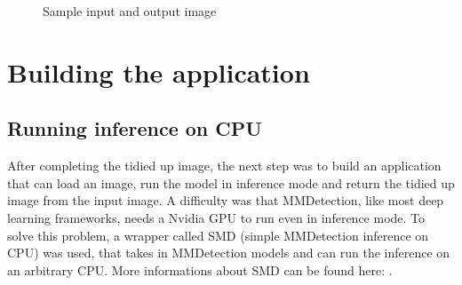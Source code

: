 \begin{figure}[H]
    \centering
    \caption{\label{fig:sample-input-output} Sample input and output image}
\end{figure}

\section{Building the application}

\subsection{Running inference on CPU}
\label{inference-cpu}

After completing the tidied up image, the next step was to build an application that can load an image, run the model in inference mode and return the tidied up image from the input image. A difficulty was that MMDetection, like most deep learning frameworks, needs a Nvidia GPU to run even in inference mode. To solve this problem, a wrapper called SMD (simple MMDetection inference on CPU) was used, that takes in MMDetection models and can run the inference on an arbitrary CPU. More informations about SMD can be found here:  \cite{SMD}.

